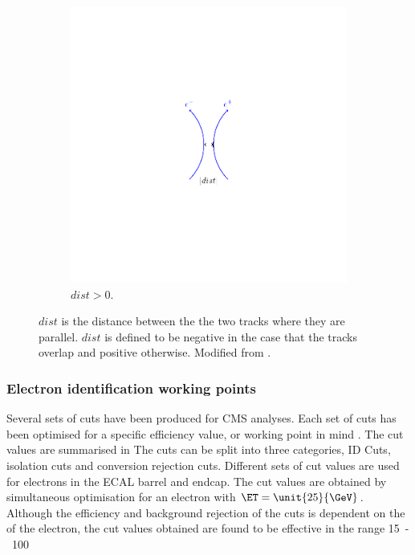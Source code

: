 \begin{figure}[htbp]
\begin{subfigure}{0.45\textwidth}
    \includegraphics[trim = 40mm 40mm 40mm 40mm, clip,width=\textwidth]{dist_p}
    \caption{$dist>0$.}
    \label{fig:dist_p}
  \end{subfigure}
  \caption{$dist$ is the distance between the the two tracks where they are
parallel. $dist$ is defined to be negative in the case that the tracks overlap
and positive otherwise. Modified from \cite{barge2009conversion}. } 
\label{fig:dist}
\end{figure}

\subsubsection{Electron identification working points}

Several sets of cuts have been produced for CMS analyses. Each set of cuts has
been optimised for a specific efficiency value, or working point in mind
\cite{nikos,daskalakis2009data,simplecutbasedeleid}.  The cut values are
summarised in  The cuts can be split into three
categories, ID Cuts, isolation cuts and conversion rejection cuts. Different
sets of cut values are used for electrons in the ECAL barrel and endcap. The cut
values are obtained by simultaneous optimisation for an electron with
$\ET=\unit{25}{\GeV}$. Although the efficiency and background rejection of the
cuts is dependent on the \ET of the electron, the cut values obtained are found
to be effective in the range \unit{15-100}{\GeV}

